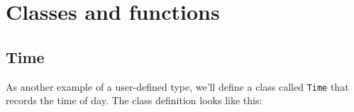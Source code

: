 %
%
%
%
%
%
%
%
%
%
%
%
%
%
%







\chapter{Classes and functions}
\label{time}


\section{Time}

As another example of a user-defined type, we'll define a class called
{\tt Time} that records the time of day.  The class definition looks
like this:


